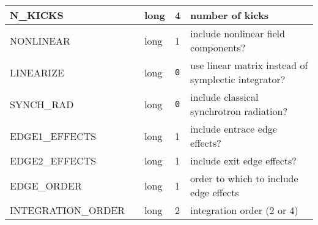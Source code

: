 \begin{tabular}{|l|l|l|l|p{\descwidth}|}
N\_KICKS &  & long &   4               & number of kicks  \\ \hline 
NONLINEAR &  & long &   1               & include nonlinear field components?  \\ \hline 
LINEARIZE &  & long &  \verb|0| & use linear matrix instead of symplectic integrator?  \\ \hline 
SYNCH\_RAD &  & long &  \verb|0| & include classical synchrotron radiation?  \\ \hline 
EDGE1\_EFFECTS &  & long &   1               & include entrace edge effects?  \\ \hline 
EDGE2\_EFFECTS &  & long &   1               & include exit edge effects?  \\ \hline 
EDGE\_ORDER &  & long &   1               & order to which to include edge effects  \\ \hline 
INTEGRATION\_ORDER &  & long &   2               & integration order (2 or 4)  \\ \hline 
\end{tabular}

